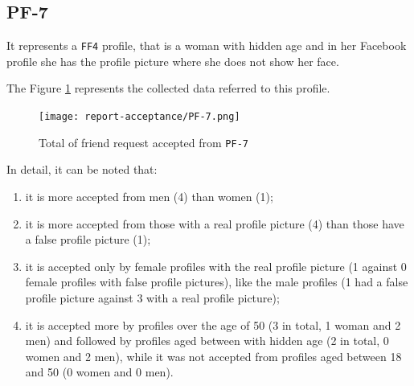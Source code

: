 \subsection*{PF-7}
It represents a \texttt{FF4} profile, that is a woman with hidden age and in her Facebook profile she has the profile picture where she does not show her face.
\par \noindent The Figure \ref{fig:accepted-from-PF7} represents the collected data referred to this profile.
\begin{figure}[H]	
	\centering
	\texttt{[image: report-acceptance/PF-7.png]} 
	\caption{Total of friend request accepted from \texttt{PF-7}}
	\label{fig:accepted-from-PF7}
\end{figure}
\par \noindent In detail, it can be noted that:
\begin{enumerate}
	\item it is more accepted from men (4) than women (1);
	\item it is more accepted from those with a real profile picture (4) than those have a false profile picture (1);
	\item it is accepted only by female profiles with the real profile picture (1 against 0 female profiles with false profile pictures), like the male profiles (1 had a false profile picture against 3 with a real profile picture);
	\item it is accepted more by profiles over the age of 50 (3 in total, 1 woman and 2 men) and followed by profiles aged between with hidden age (2 in total, 0 women and 2 men), while it was not accepted from profiles aged between 18 and 50 (0 women and 0 men).
\end{enumerate}


